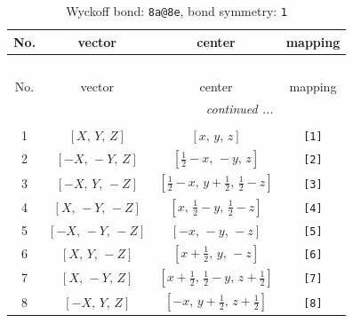 \documentclass[fleqn,8pt]{jsarticle}
\begin{document}
\begin{longtable}{cccc}
\caption{Wyckoff bond: {\tt 8a@8e}, bond symmetry: {\tt 1}}
 \\
 \hline \hline
No. & vector & center & mapping \\ \hline \endfirsthead

\multicolumn{3}{l}{\tablename\ \thetable{}} \\
 \hline \hline
No. & vector & center & mapping \\ \hline \endhead

 \hline \hline
\multicolumn{3}{r}{\footnotesize\it continued ...} \\ \endfoot

 \hline \hline
\multicolumn{3}{r}{} \\ \endlastfoot

1 & $\left[ X,\, Y,\, Z \right]$ & $\left[ x,\, y,\, z \right]$ & {\tt [1]} \\ \hline
2 & $\left[ - X,\, - Y,\, Z \right]$ & $\left[ \frac{1}{2} - x,\, - y,\, z \right]$ & {\tt [2]} \\ \hline
3 & $\left[ - X,\, Y,\, - Z \right]$ & $\left[ \frac{1}{2} - x,\, y + \frac{1}{2},\, \frac{1}{2} - z \right]$ & {\tt [3]} \\ \hline
4 & $\left[ X,\, - Y,\, - Z \right]$ & $\left[ x,\, \frac{1}{2} - y,\, \frac{1}{2} - z \right]$ & {\tt [4]} \\ \hline
5 & $\left[ - X,\, - Y,\, - Z \right]$ & $\left[ - x,\, - y,\, - z \right]$ & {\tt [5]} \\ \hline
6 & $\left[ X,\, Y,\, - Z \right]$ & $\left[ x + \frac{1}{2},\, y,\, - z \right]$ & {\tt [6]} \\ \hline
7 & $\left[ X,\, - Y,\, Z \right]$ & $\left[ x + \frac{1}{2},\, \frac{1}{2} - y,\, z + \frac{1}{2} \right]$ & {\tt [7]} \\ \hline
8 & $\left[ - X,\, Y,\, Z \right]$ & $\left[ - x,\, y + \frac{1}{2},\, z + \frac{1}{2} \right]$ & {\tt [8]} \\
\end{longtable}
\end{document}
